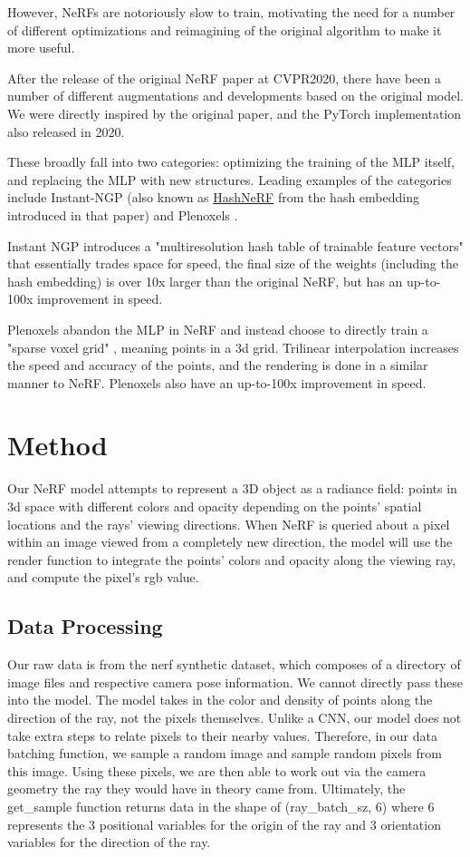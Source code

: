 However, NeRFs are notoriously slow to train, motivating the need for a number of different optimizations and reimagining of the original algorithm to make it more useful. 

After the release of the original NeRF paper at CVPR2020, there have been a number of different augmentations and developments based on the original model. We were directly inspired by the original paper, and the PyTorch implementation also released in 2020. 

These broadly fall into two categories: optimizing the training of the MLP itself, and replacing the MLP with new structures. Leading examples of the categories include Instant-NGP \cite{ingp} (also known as \href{https://github.com/yashbhalgat/HashNeRF-pytorch}{HashNeRF} from the hash embedding introduced in that paper) and Plenoxels \cite{pleno}.

Instant NGP introduces a "multiresolution hash table of trainable feature vectors" \cite{ingp} that essentially trades space for speed, the final size of the weights (including the hash embedding) is over 10x larger than the original NeRF, but has an up-to-100x improvement in speed.

Plenoxels abandon the MLP in NeRF and instead choose to directly train a "sparse voxel grid" \cite{pleno}, meaning points in a 3d grid. Trilinear interpolation increases the speed and accuracy of the points, and the rendering is done in a similar manner to NeRF. Plenoxels also have an up-to-100x improvement in speed. 

\section{Method}

Our NeRF model attempts to represent a 3D object as a radiance field: points in 3d space with different colors and opacity depending on the points' spatial locations and the rays' viewing directions. When NeRF is queried about a pixel within an image viewed from a completely new direction, the model will use the render function to integrate the points' colors and opacity along the viewing ray, and compute the pixel's rgb value.

\subsection{Data Processing}

Our raw data is from the nerf synthetic dataset, which composes of a directory of image files and respective camera pose information. We cannot directly pass these into the model. The model takes in the color and density of points along the direction of the ray, not the pixels themselves. Unlike a CNN, our model does not take extra steps to relate pixels to their nearby values. Therefore, in our data batching function, we sample a random image and sample random pixels from this image. Using these pixels, we are then able to work out via the camera geometry the ray they would have in theory came from. Ultimately, the get\_sample function returns data in the shape of (ray\_batch\_sz, 6) where 6 represents the 3 positional variables for the origin of the ray and 3 orientation variables for the direction of the ray.

